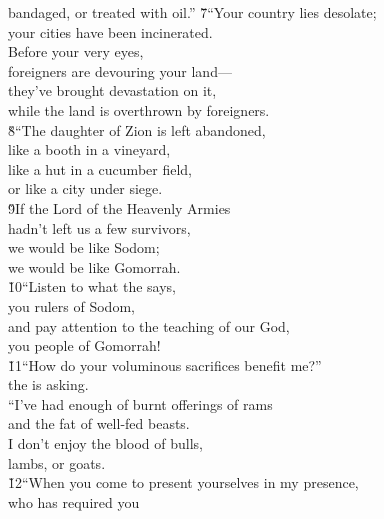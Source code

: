 \begin{poetry}
\poemll    bandaged, or treated with oil.''
\poeml \v{7}``Your country lies desolate; \\
\poemll    your cities have been incinerated. \\
\poeml Before your very eyes, \\
\poemll    foreigners are devouring your land--- \\
\poeml they've brought devastation on it, \\
\poemll    while the land is overthrown by foreigners. \\
\poeml \v{8}``The daughter of Zion is left abandoned, \\
\poemll    like a booth in a vineyard, \\
\poeml like a hut in a cucumber field, \\
\poemll    or like a city under siege. \\
\poeml \v{9}If the Lord of the Heavenly Armies \\
\poemll    hadn't left us a few survivors, \\
\poeml we would be like Sodom; \\
\poemll    we would be like Gomorrah. \\
\poeml \v{10}``Listen to what the  says, \\
\poemll    you rulers of Sodom, \\
\poeml and pay attention to the teaching of our God, \\
\poemll    you people of Gomorrah! \\
\poeml \v{11}``How do your voluminous sacrifices benefit me?'' \\
\poemll    the  is asking. \\
\poeml ``I've had enough of burnt offerings of rams \\
\poemll    and the fat of well-fed beasts. \\
\poeml I don't enjoy the blood of bulls, \\
\poemll    lambs, or goats. \\
\poeml \v{12}``When you come to present yourselves in my presence, \\
\poemll    who has required you \\

\end{poetry}
